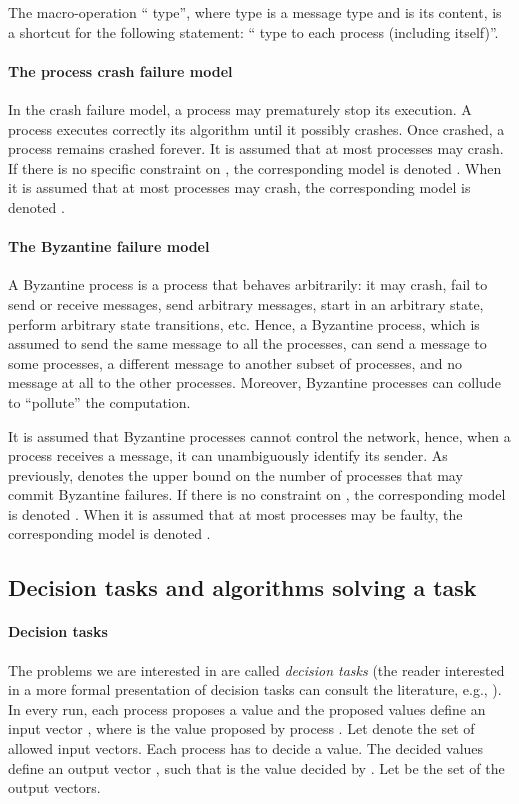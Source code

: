 \documentclass[11pt,letterpaper]{article}
\begin{document}
The macro-operation `` {\sc type}'', where {\sc type} is
a message type and  is its content,  is a shortcut for the following
statement: `` {\sc type} to each process (including itself)''.




\paragraph{The process crash failure model}
In the crash failure model, a process may prematurely stop its execution.
A process executes correctly its algorithm until it possibly crashes.
Once crashed, a process remains crashed forever.
It is assumed that at most  processes may crash.
If there is no specific constraint on , the corresponding model
is denoted  .
When  it is assumed that at most  processes
may crash,  the corresponding model is denoted .


\paragraph{The Byzantine failure model}
A  Byzantine process is a process that behaves
arbitrarily: it may crash, fail to send or receive messages, send
arbitrary messages, start in an arbitrary state, perform arbitrary state
transitions, etc. Hence, a Byzantine process, which is assumed to send the
same message  to all the processes, can send a message  to some
processes, a different message   to another subset of processes, and no
message at all to the other processes. Moreover, Byzantine processes can
 collude to ``pollute'' the computation.

It is assumed that Byzantine processes cannot control the network, hence,
when  a process receives a  message, it can unambiguously identify its sender.
As previously,  denotes the upper bound on the number of processes that
may commit Byzantine failures.
If there is no constraint on , the corresponding model
is denoted  .
When  it is assumed that at most  processes may be faulty,
the corresponding model is denoted .


\subsection{Decision tasks and algorithms solving a task}

\paragraph{Decision tasks}
The problems we are interested in are called {\it decision tasks}
(the reader interested in a more formal presentation of  decision tasks can
consult the literature, e.g., \cite{BGLR01,HS99}).
In every run, each process proposes a value and the proposed values define
an input vector , where  is the value proposed by process .
Let  denote the set of  allowed input vectors.
Each process has to decide a value. The decided values define an
output  vector ,  such that   is  the value  decided by  .
Let  be the  set of  the output vectors.
\end{document}
